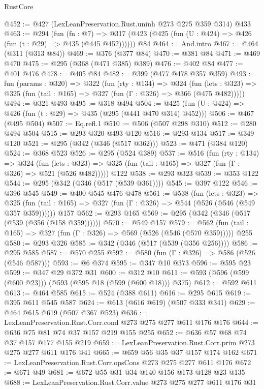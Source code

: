 \begin{lexlean}{RustCore}
\begin{coremodule}
@452 := @427 (LexLeanPreservation.Rust.uninh @273 @275 @359 @314) @433
@463 := @294
    (fun (fn : @7) =>
    @317 (@423 (@425 (fun (U : @424) => @426 (fun (t : @29) => @435 (@445 @452))))))
    @84
@464 := And.intro
@467 := @464 (@311 (@313 @84))
@469 := @376 (@377 @84)
@470 := @381 @84
@471 := @469 @470
@475 := @295 (@368 (@471 @385) @389)
@476 := @402 @84
@477 := @401 @476
@478 := @405 @84
@482 := @399 (@477 @478 @357 @359)
@493 := fun (params : @320) =>
  @322
    (fun (rty : @134) =>
    @324
      (fun (lets : @323) => @325 (fun (tail : @165) => @327 (fun (Γ : @326) => @366 (@475 @482)))))
@494 := @321 @493
@495 := @318 @494
@504 := @425 (fun (U : @424) => @426 (fun (t : @29) => @435 (@295 (@441 @470 @314) @452)))
@506 := @467 (@495 @504)
@507 := Eq.refl.{1}
@510 := @506 (@507 @298 @310)
@512 := @280 @494 @504
@515 := @293 @320 @493 @120
@516 := @293 @134
@517 := @349 @120
@521 := @295 (@342 (@346 (@517 @362)))
@523 := @471 (@384 @120)
@524 := @368 @523
@526 := @295 (@524 @389)
@537 := @516
    (fun (rty : @134) =>
    @324
      (fun (lets : @323) => @325 (fun (tail : @165) => @327 (fun (Γ : @326) => @521 (@526 @482)))))
    @122
@538 := @293 @323
@539 := @353 @122
@544 := @295 (@342 (@346 (@517 (@539 @361))))
@545 := @397 @122
@546 := @396 @545
@549 := @400 @545 @476 @478
@561 := @538
    (fun (lets : @323) =>
    @325 (fun (tail : @165) => @327 (fun (Γ : @326) => @544 (@526 (@546 (@549 @357 @359))))))
    @157
@562 := @293 @165
@569 := @295 (@342 (@346 (@517 (@539 (@356 (@158 @359))))))
@570 := @549 @157
@579 := @562 (fun (tail : @165) => @327 (fun (Γ : @326) => @569 (@526 (@546 (@570 @359))))) @255
@580 := @293 @326
@585 := @342 (@346 (@517 (@539 (@356 @256))))
@586 := @295 @585
@587 := @570 @255
@592 := @580 (fun (Γ : @326) => @586 (@526 (@546 @587)))
@593 := @6 @374
@595 := @347 @10 @373
@596 := @595 @23
@599 := @347 @29 @372 @31
@600 := @312 @10
@611 := @593 (@596 (@599 (@600 @23))) (@593 (@595 @18 (@599 (@600 @18))) @375)
@612 := @592 @611
@613 := @464 @585
@615 := @524 (@388 @611)
@616 := @295 @615
@619 := @395 @611 @545 @587
@624 := @613 (@616 @619) (@507 @333 @341)
@629 := @464 @615 @619 (@507 @367 @523)
@636 := LexLeanPreservation.Rust.Corr.cond @273 @275 @277 @611 @176 @176
@644 := @636 @75 @81 @74 @37 @157 @219 @155 @255
@652 := @636 @57 @68 @74 @37 @157 @177 @155 @219
@659 := LexLeanPreservation.Rust.Corr.prim @273 @275 @277 @611 @176 @41
@665 := @659 @56 @35 @37 @157 @174 @162
@671 := LexLeanPreservation.Rust.Corr.opsCons @273 @275 @277 @611 @176
@672 := @671 @49
@681 := @672 @55 @31 @34 @140 @156 @173 @128 @23 @135
@688 := LexLeanPreservation.Rust.Corr.value @273 @275 @277 @611 @176 @31

\end{coremodule}
\end{lexlean}

